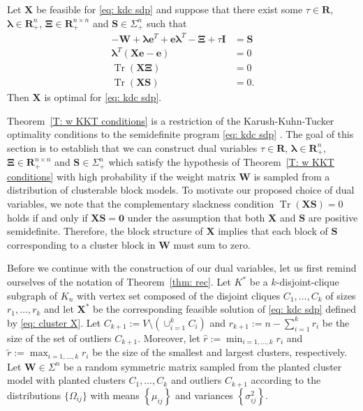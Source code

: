 \documentclass[twoside,11pt]{article}
\renewcommand{\S}{\mathbf{S}}
\newcommand{\R}{\mathbf{R}}
\DeclareMathOperator{\tr}{{Tr}}
\newcommand{\e}{\bs {e}}
\newcommand{\bs}{\boldsymbol}
\newcommand{\X}{\bs {X}}
\newcommand{\W}{\bs {W}}
\newcommand{\0}{\bs{0}}
\newcommand{\bra}[1]{\ensuremath{\left\{ #1 \right\}}} %
\begin{document}
{\renewcommand{\S}{\bs{S}}
\begin{theorem}
	\label{T:  w KKT conditions}
	Let $\X$ be feasible for \eqref{eq: kdc sdp} and suppose that
	there exist some $\tau \in \R$, $\bs\lambda \in \R^n_+$, $\bs\Xi \in \R^{n\times n}_{+}$ and $\S \in \Sigma^n_+$ such that
	\begin{align}
	- \W + \bs\lambda \e^T + \e \bs\lambda^T - \bs\Xi + \tau \bs I &= \S \label{E: w dual feas} \\
	\bs\lambda^T (\X\e - \e)  &= 0  \label{E: w CS rowsum} \\
	\tr(\X  \bs\Xi) &= 0 \label{E: w CS nonneg} \\
	\tr (\X \S)  &= 0. \label{E: w CS sdp}
	\end{align}
	Then $\X$ is optimal for \eqref{eq: kdc sdp}.
\end{theorem}

Theorem~\ref{T: w KKT conditions} is a restriction of the Karush-Kuhn-Tucker optimality conditions
to the semidefinite program \eqref{eq: kdc sdp} \citep[see for example][Section 5.5.3]{boyd2009convex}.
The goal of this section is to establish that we can construct dual variables $\tau \in \R$, $\bs\lambda \in \R^n_+$, $\bs\Xi \in \R^{n\times n}_{+}$ and $\S \in \Sigma^n_+$
which satisfy the hypothesis
of Theorem~\eqref{T: w KKT conditions} with high probability if the weight matrix \(\W\) is
sampled from a distribution of clusterable block models.
To motivate our proposed choice of dual variables, we note that
the complementary slackness condition \(\tr(\X\S) = 0\) holds if and only if \(\X\S = \bs 0\) under the assumption that
both \(\X\) and \(\S\) are positive semidefinite.
Therefore, the block structure of \(\X\) implies that
each block of \(\S\) corresponding to a cluster block in \(\W\) must sum to zero.

Before we continue with the construction of our dual variables, let us first remind ourselves
of the notation of Theorem~\ref{thm: rec}.
Let $K^*$ be a $k$-disjoint-clique subgraph of $K_n$ with vertex set composed of the disjoint cliques $C_1, \dots, C_k$ of sizes $r_1, \dots, r_k$  and let
$\X^*$ be the corresponding feasible solution of \eqref{eq: kdc sdp} defined by \eqref{eq: cluster X}.
Let $C_{k+1} := V \setminus  (\cup^k_{i=1} C_i)$ and $r_{k+1} := n - \sum_{i=1}^k r_i$ be the size of the set
of outliers \(C_{k+1}\).
Moreover, let $\hat r := \min_{i=1, \dots, k} r_i$ and
\( \tilde r := \max_{i=1,\dots, k} r_i\)  be the size of the smallest and largest clusters,
respectively.
Let $\W \in \Sigma^n$ be a random symmetric matrix
sampled from the planted cluster model with planted clusters \(C_1, \dots, C_k\) and
outliers \(C_{k+1}\)
according to the distributions \(\{\Omega_{ij}\}\) with means \( \bra{\mu_{ij}} \)
and variances $\bra{\sigma^2_{ij}}$.

}
\end{document}
